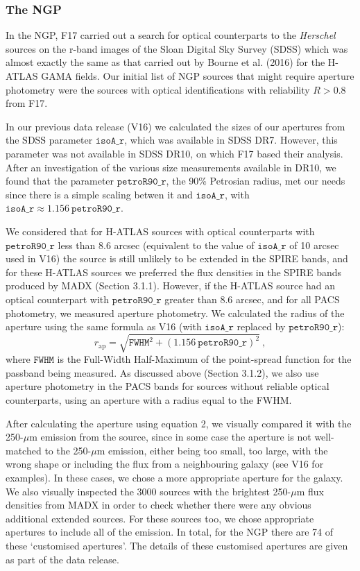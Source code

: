 \documentclass[useAMS,usenatbib]{mnras}
\begin{document}
\subsubsection{The NGP}

In the NGP, F17 carried out a search for optical counterparts to the
{\it Herschel} sources on the r-band images of the Sloan Digital Sky
Survey (SDSS) which was almost exactly the same as that carried out by
Bourne et al. (2016) for the H-ATLAS GAMA fields.  Our initial list of
NGP sources that might require aperture photometry were the sources
with optical identifications with reliability $R>0.8$ from F17.

In our previous data release (V16) we calculated the sizes of our
apertures from the SDSS parameter $\mathtt{isoA\_r}$, which was
available in SDSS DR7. However, this parameter was not available in
SDSS DR10, on which F17 based their analysis.  After an investigation
of the various size measurements available in DR10, we found that the
parameter $\mathtt{petroR90\_r}$, the 90\% Petrosian radius, met our
needs since there is a simple scaling betwen it and
$\mathtt{isoA\_r}$, with
$\mathtt{isoA\_r} \approx 1.156 \ \mathtt{petroR90\_r}$.

We considered that for H-ATLAS sources with optical counterparts with
$\mathtt{petroR90\_r}$ less than 8.6 arcsec (equivalent to the value
of $\mathtt{isoA\_r}$ of 10 arcsec used in V16) the source is still
unlikely to be extended in the SPIRE bands, and for these H-ATLAS
sources we preferred the flux densities in the SPIRE bands produced by
MADX (Section 3.1.1).  However, if the H-ATLAS source had an optical
counterpart with $\mathtt{petroR90\_r}$ greater than 8.6 arcsec, and
for all PACS photometry, we measured aperture photometry.  We
calculated the radius of the aperture using the same formula as V16
(with $\mathtt{isoA\_r}$ replaced by $\mathtt{petroR90\_r}$):
\smallskip
\begin{equation} 
r_\mathrm{ap} = \sqrt{ \mathtt{FWHM}^2 + {(1.156
    \ \mathtt{petroR90\_r})}^2}\ , 
\end{equation}
\smallskip where $\mathtt{FWHM}$ is the Full-Width Half-Maximum of the
point-spread function for the passband being measured. As discussed
above (Section 3.1.2), we also use aperture photometry in the PACS
bands for sources without reliable optical counterparts, using an
aperture with a radius equal to the FWHM.

After calculating the aperture using equation 2, we visually compared
it with the 250-$\mu$m emission from the source, since in some case
the aperture is not well-matched to the 250-$\mu$m emission, either
being too small, too large, with the wrong shape or including the flux
from a neighbouring galaxy (see V16 for examples).  In these cases, we
chose a more appropriate aperture for the galaxy.  We also visually
inspected the 3000 sources with the brightest 250-$\mu$m flux
densities from MADX in order to check whether there were any obvious
additional extended sources.  For these sources too, we chose
appropriate apertures to include all of the emission.  In total, for
the NGP there are 74 of these `customised apertures'.  The details of
these customised apertures are given as part of the data release.
\end{document}
